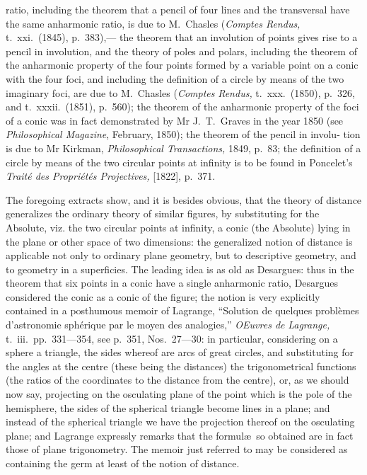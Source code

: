 \documentclass[11pt,a4paper]{book}
\begin{document}
\begin{center}
ratio, including the theorem that a pencil of four lines and the transversal have the
same anharmonic ratio, is due to M.~Chasles (\textit{Comptes Rendus,} t.~xxi.\ (1845), p.~383),---
the theorem that an involution of points gives rise to a pencil in involution, and the
theory of poles and polars, including the theorem of the anharmonic property of the
four points formed by a variable point on a conic with the four foci, and including the
definition of a circle by means of the two imaginary foci, are due to M.~Chasles (\textit{Comptes}
\textit{Rendus,} t.~xxx.\ (1850), p.~326, and t.~xxxii.\ (1851), p.~560); the theorem of the anharmonic
property of the foci of a conic was in fact demonstrated by Mr J.~T.~Graves in the year
1850 (see \textit{Philosophical Magazine}, February, 1850); the theorem of the pencil in involu-
tion is due to Mr Kirkman, \textit{Philosophical Transactions,} 1849, p.~83; the definition of a
circle by means of the two circular points at infinity is to be found in Poncelet's
\textit{Trait\'{e} des Propri\'{e}t\'{e}s Projectives,} [1822], p.~371.

The foregoing extracts show, and it is besides obvious, that the theory of distance
generalizes the ordinary theory of similar figures, by substituting for the Absolute, viz.
the two circular points at infinity, a conic (the Absolute) lying in the plane or other
space of two dimensions: the generalized notion of distance is applicable not only to
ordinary plane geometry, but to descriptive geometry, and to geometry in a superficies.
The leading idea is as old as Desargues: thus in the theorem that six points in a conic
have a single anharmonic ratio, Desargues considered the conic as a conic of the figure;
the notion is very explicitly contained in a posthumous memoir of Lagrange, ``Solution
de quelques probl\`{e}mes d'astronomie sph\'{e}rique par le moyen des analogies,'' \textit{OEuvres de}
\textit{Lagrange,} t.~iii.\ pp.~331---354, see p.~351, Nos.~27---30: in particular, considering on a
sphere a triangle, the sides whereof are arcs of great circles, and substituting for the
angles at the centre (these being the distances) the trigonometrical functions (the ratios
of the coordinates to the distance from the centre), or, as we should now say, projecting
on the osculating plane of the point which is the pole of the hemisphere, the sides of the
spherical triangle become lines in a plane; and instead of the spherical triangle we have
the projection thereof on the osculating plane; and Lagrange expressly remarks that the
formul\ae\ so obtained are in fact those of plane trigonometry. The memoir just referred
to may be considered as containing the germ at least of the notion of distance.


\end{center}
\end{document}

